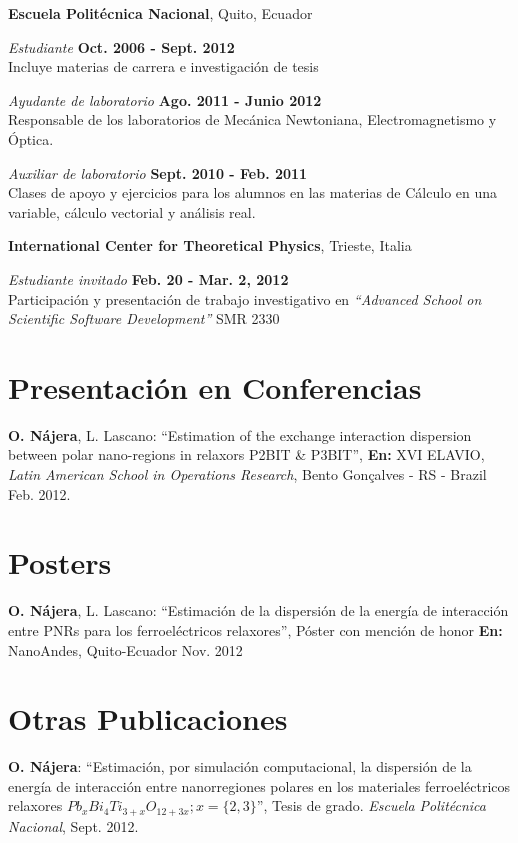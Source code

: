 \documentclass[margin,line]{res}
\newenvironment{list1}{
  \begin{list}{\ding{113}}{%
      \setlength{\itemsep}{0in}
      \setlength{\parsep}{0in} \setlength{\parskip}{0in}
      \setlength{\topsep}{0in} \setlength{\partopsep}{0in} 
      \setlength{\leftmargin}{0.17in}}}{\end{list}}
\begin{document}
\begin{resume}
  {\bf Escuela Politécnica Nacional}, Quito, Ecuador
  \begin{list1}
   \item[] {\em Estudiante} \hfill {\bf Oct. 2006 - Sept. 2012}\\
    Incluye materias de carrera e investigación de tesis\\
   \item[] {\em Ayudante de laboratorio} \hfill {\bf Ago. 2011 - Junio 2012}\\
    Responsable de los laboratorios de Mecánica Newtoniana, Electromagnetismo y Óptica.\\
   \item[] {\em Auxiliar de laboratorio} \hfill {\bf Sept. 2010 - Feb. 2011}\\
    Clases de apoyo y ejercicios para los alumnos en las materias de Cálculo en una
    variable, cálculo vectorial y análisis real.
  \end{list1}

  {\bf International Center for Theoretical Physics}, Trieste, Italia
  \begin{list1}
    \item[] {\em Estudiante invitado} \hfill {\bf Feb. 20 - Mar. 2, 2012} \\
    Participación y presentación de trabajo investigativo en  {\em ``Advanced School on Scientific
    Software Development''} SMR 2330
  \end{list1}

\section{\sc Presentación en Conferencias}
  {\bf O. Nájera}, L. Lascano: ``Estimation of the exchange interaction dispersion between polar
  nano-regions in relaxors P2BIT \& P3BIT'', {\bf En:} XVI ELAVIO, {\em Latin American School in Operations Research}, Bento Gonçalves - RS - Brazil Feb. 2012.

\section{\sc Posters}
  {\bf O. Nájera}, L. Lascano: ``Estimación de la dispersión de la energía de interacción
  entre PNRs para los ferroeléctricos relaxores'',  Póster con mención de honor {\bf En:} NanoAndes, Quito-Ecuador Nov. 2012

\section{\sc Otras Publicaciones}
  {\bf O. Nájera}: ``Estimación, por simulación computacional, la dispersión de la energía de
  interacción entre nanorregiones polares en los materiales ferroeléctricos relaxores
  $Pb_xBi_4Ti_{3+x}O_{12+3x}; x=\{2,3\}$'', Tesis de grado. {\em Escuela Politécnica Nacional}, Sept. 2012.


\end{resume}
\end{document}
